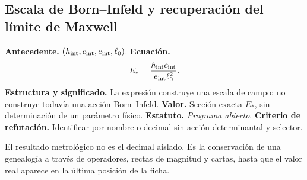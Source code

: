\subsection*{Escala de Born--Infeld y recuperación del límite de Maxwell}
\textbf{Antecedente.} \((h_{\rm int},c_{\rm int},e_{\rm int},\ell_0)\).
\textbf{Ecuaci\'on.}
\begin{equation}
E_*=\frac{h_{\rm int}c_{\rm int}}{e_{\rm int}\ell_0^2}.
\label{eq:atlas-born}
\end{equation}
\textbf{Estructura y significado.} La expresi\'on construye una escala de
campo; no construye todav\'ia una acci\'on Born--Infeld.
\textbf{Valor.} Secci\'on exacta \(E_*\), sin determinaci\'on de un
par\'ametro f\'isico.
\textbf{Estatuto.} \emph{Programa abierto}. \textbf{Criterio de refutación.} Identificar
por nombre o decimal sin acci\'on determinantal y selector.

\begin{proposition}
El resultado metrol\'ogico no es el decimal aislado. Es la conservaci\'on de
una genealog\'ia a trav\'es de operadores, rectas de magnitud y cartas, hasta
que el valor real aparece en la \'ultima posici\'on de la ficha.
\end{proposition}
